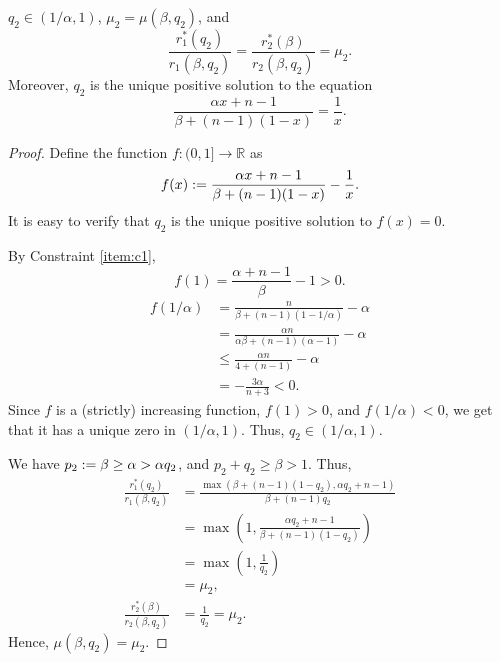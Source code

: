 \begin{lemma}
\label{thm:q2}
$q_2 \in (1/\alpha, 1)$, $\mu_2 = \mu(\beta, q_2)$, and
\[ \frac{r_1^*(q_2)}{r_1(\beta, q_2)} = \frac{r_2^*(\beta)}{r_2(\beta, q_2)} = \mu_2. \]
Moreover, $q_2$ is the unique positive solution to the equation
\[ \frac{\alpha x + n-1}{\beta + (n-1)(1-x)} = \frac{1}{x}. \]
\end{lemma}
\begin{proof}
Define the function $f: (0, 1] \to \mathbb{R}$ as
\[ f(x) := \frac{\alpha x + n-1}{\beta + (n-1)(1-x)} - \frac{1}{x}. \]
It is easy to verify that $q_2$ is the unique positive solution to $f(x) = 0$.

By Constraint \ref{item:c1},
\[ f(1) = \frac{\alpha + n-1}{\beta} - 1 > 0. \]
\begin{align*}
f(1/\alpha) &= \frac{n}{\beta + (n-1)(1-1/\alpha)} - \alpha
\\ &= \frac{\alpha n}{\alpha\beta + (n-1)(\alpha - 1)} - \alpha
\\ &\le \frac{\alpha n}{4 + (n-1)} - \alpha
    \tag{since $\alpha\beta \ge 4$ and $\alpha-1 \ge 1$}
\\ &= -\frac{3\alpha}{n+3} < 0.
\end{align*}
Since $f$ is a (strictly) increasing function, $f(1) > 0$, and $f(1/\alpha) < 0$,
we get that it has a unique zero in $(1/\alpha, 1)$.
Thus, $q_2 \in (1/\alpha, 1)$.

We have $p_2 := \beta \ge \alpha > \alpha q_2$, and $p_2 + q_2 \ge \beta > 1$. Thus,
\begin{align*}
\frac{r_1^*(q_2)}{r_1(\beta, q_2)} &= \frac{\max(\beta + (n-1)(1-q_2), \alpha q_2 + n-1)}{\beta + (n-1)q_2}
\\ &= \max\left(1, \frac{\alpha q_2 + n-1}{\beta + (n-1)(1-q_2)}\right)
\\ &= \max\left(1, \frac{1}{q_2}\right)
    \tag{since $f(q_2) = 0$}
\\ &= \mu_2,
\\ \frac{r_2^*(\beta)}{r_2(\beta, q_2)} &= \frac{1}{q_2} = \mu_2.
\end{align*}
Hence, $\mu(\beta, q_2) = \mu_2$.
\end{proof}

